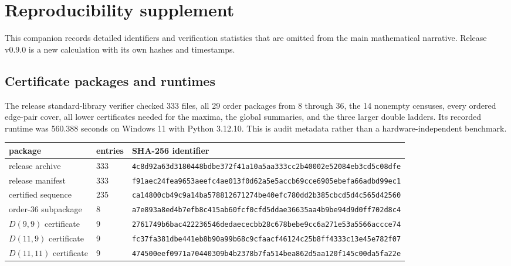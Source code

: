 \section*{Reproducibility supplement}

This companion records detailed identifiers and verification statistics that
are omitted from the main mathematical narrative.  Release v0.9.0 is a new
calculation with its own hashes and timestamps.

\subsection*{Certificate packages and runtimes}

The release standard-library verifier checked 333 files, all 29 order packages
from 8 through 36, the 14 nonempty censuses, every ordered edge-pair cover, all
lower certificates needed for the maxima, the global summaries, and the three
larger double ladders.  Its recorded runtime was 560.388 seconds on Windows 11
with Python 3.12.10.  This is audit metadata rather than a
hardware-independent benchmark.

\begin{center}
\scriptsize
\begin{tabular}{lll}
\toprule
package & entries & SHA-256 identifier \\
\midrule
release archive & 333 &
\nolinkurl{4c8d92a63d3180448bdbe372f41a10a5aa333cc2b40002e52084eb3cd5c08dfe}\\
release manifest & 333 &
\nolinkurl{f91aec24fea9653aeefc4ae013f0d62a5e5accb69cce6905ebefa66adbd99ec1}\\
certified sequence & 235 &
\nolinkurl{ca14800cb49c9a14ba578812671274be40efc780dd2b385cbcd5d4c565d42560}\\
order-36 subpackage & 8 &
\nolinkurl{a7e893a8ed4b7efb8c415ab60fcf0cfd5ddae36635aa4b9be94d9d0ff702d8c4}\\
$D(9,9)$ certificate & 9 &
\nolinkurl{2761749b6bac422236546dedaececbb28c678bebe9cc6a271e53a5566accce74}\\
$D(11,9)$ certificate & 9 &
\nolinkurl{fc37fa381dbe441eb8b90a99b68c9cfaacf46124c25b8ff4333c13e45e782f07}\\
$D(11,11)$ certificate & 9 &
\nolinkurl{474500eef0971a70440309b4b2378b7fa514bea862d5aa120f145c00da5fa22e}\\
\bottomrule
\end{tabular}
\end{center}

